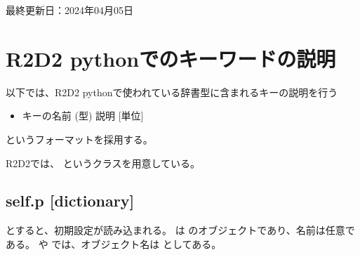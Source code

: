 \documentclass[letterpaper,10pt,dvipdfmx,report]{sphinxmanual}
\begin{document}
\sphinxAtStartPar
最終更新日：2024年04月05日

\sphinxstepscope


\chapter{R2D2 pythonでのキーワードの説明}
\label{\detokenize{notation:r2d2-python}}\label{\detokenize{notation::doc}}
\sphinxAtStartPar
以下では、R2D2 pythonで使われている辞書型に含まれるキーの説明を行う
\begin{itemize}
\item {} 
\sphinxAtStartPar
キーの名前 (型) \sphinxhyphen{}\sphinxhyphen{} 説明 {[}単位{]}

\end{itemize}

\sphinxAtStartPar
というフォーマットを採用する。

\sphinxAtStartPar
R2D2では、 というクラスを用意している。


\section{self.p {[}dictionary{]}}
\label{\detokenize{notation:self-p-dictionary}}
\begin{sphinxVerbatim}[commandchars=\\\{\}]
 
  
\end{sphinxVerbatim}

\sphinxAtStartPar
とすると、初期設定が読み込まれる。  は  のオブジェクトであり、名前は任意である。  や  では、オブジェクト名は  としてある。
\end{document}
